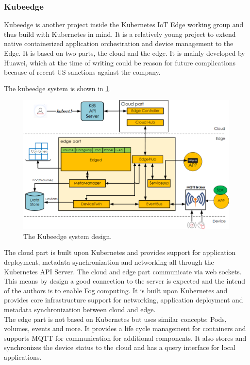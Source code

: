 \subsubsection{Kubeedge}
Kubeedge is another project inside the Kubernetes IoT Edge working group and thus build with Kubernetes in mind. It is a relatively young project to extend native containerized application orchestration and device management to the Edge. It is based on two parts, the cloud and the edge. It is mainly developed by Huawei, which at the time of writing could be reason for future complications because of recent US sanctions against the company.

The kubeedge system is shown in \cref{fig:kubeedgeStruct}.
\begin{figure}[h!]
    \centering
    \includegraphics[width=(\textwidth+4cm)/2]{figures/kubeedge_arch.png}
    \caption{The Kubeedge system design.}
    \label{fig:kubeedgeStruct}
\end{figure}

The cloud part is built upon Kubernetes and provides support for application deployment, metadata synchronization and networking all through the Kubernetes API Server. The cloud and edge part communicate via web sockets. This means by design a good connection to the server is expected and the intend of the authors is to enable Fog computing. It is built upon Kubernetes and provides core infrastructure support for networking, application deployment and metadata synchronization between cloud and edge.\\
The edge part is not based on Kubernetes but uses similar concepts: Pods, volumes, events and more. It provides a life cycle management for containers and supports MQTT for communication for additional components. It also stores and synchronizes the device status to the cloud and has a query interface for local applications.

